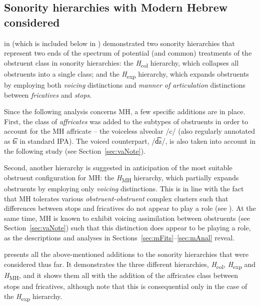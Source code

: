 \subsection{Sonority hierarchies with Modern Hebrew considered}\label{sec:sonHierarchyMH}

 in  (which is included below in ) demonstrated two sonority hierarchies that represent two ends of the spectrum of potential (and common) treatments of the obstruent class in sonority hierarchies: the \emph{H}\textsubscript{col} hierarchy, which collapses all obstruents into a single class; and the \emph{H}\textsubscript{exp} hierarchy, which expands obstruents by employing both \emph{voicing} distinctions and \emph{manner of articulation} distinctions between \emph{fricatives} and \emph{stops}.

Since the following analysis concerns MH, a few specific additions are in place. First, the class of \emph{affricates} was added to the subtypes of obstruents in order to account for the MH affricate -- the voiceless alveolar /c/ (also regularly annotated as t͡s in standard IPA).
The voiced counterpart, /d͡z/,
is also taken into account in the following study (see Section~\ref{sec:vaNote}).

Second, another hierarchy is suggested in anticipation of the most suitable obstruent configuration for MH: the \emph{H}\textsubscript{MH} hierarchy, which partially expands obstruents by employing only \emph{voicing} distinctions. This is in line with the fact that MH tolerates various \emph{obstruent-obstruent} complex clusters such that differences between stops and fricatives do not appear to play a role (see ). At the same time, MH is known to exhibit voicing assimilation between obstruents (see Section~\ref{sec:vaNote}) such that this distinction does appear to be playing a role, as the descriptions and analyses in Sections~\ref{sec:mFits}--\ref{sec:mAnal} reveal.

 presents all the above-mentioned additions to the sonority hierarchies that were considered thus far. It demonstrates the three different hierarchies, \emph{H}\textsubscript{col}, \emph{H}\textsubscript{exp} and \emph{H}\textsubscript{MH}, and it shows them all with the addition of the affricates class between stops and fricatives, although note that this is consequential only in the case of the \emph{H}\textsubscript{exp} hierarchy.


